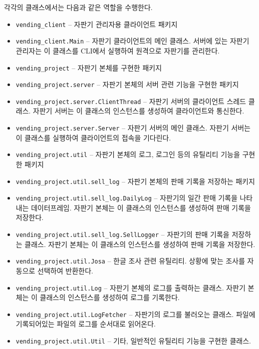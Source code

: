\documentclass{oblivoir}
\begin{document}
    각각의 클래스에서는 다음과 같은 역할을 수행한다.

    \begin{itemize}
        \item \texttt{vending\_client} -- 자판기 관리자용 클라이언트 패키지
        \item \texttt{vending\_client.Main} --
        자판기 클라이언트의 메인 클래스. 서버에 있는 자판기 관리자는 이 클래스를 CLI에서 실행하여 원격으로 자판기를 관리한다.
        \item \texttt{vending\_project} -- 자판기 본체를 구현한 패키지
        \item \texttt{vending\_project.server} -- 자판기 본체의 서버 관련 기능을 구현한 패키지
        \item \texttt{vending\_project.server.ClientThread} --
        자판기 서버의 클라이언트 스레드 클래스. 자판기 서버는 이 클래스의 인스턴스를 생성하여 클라이언트와 통신한다.
        \item \texttt{vending\_project.server.Server} --
        자판기 서버의 메인 클래스. 자판기 서버는 이 클래스를 실행하여 클라이언트의 접속을 기다린다.
        \item \texttt{vending\_project.util} -- 자판기 본체의 로그, 로그인 등의 유틸리티 기능을 구현한 패키지
        \item \texttt{vending\_project.util.sell\_log} -- 자판기 본체의 판매 기록을 저장하는 패키지
        \item \texttt{vending\_project.util.sell\_log.DailyLog} --
        자판기의 일간 판매 기록을 나타내는 데이터프레임. 자판기 본체는 이 클래스의 인스턴스를 생성하여 판매 기록을 저장한다.
        \item \texttt{vending\_project.util.sell\_log.SellLogger} --
        자판기의 판매 기록을 저장하는 클래스. 자판기 본체는 이 클래스의 인스턴스를 생성하여 판매 기록을 저장한다.
        \item \texttt{vending\_project.util.Josa} --
        한글 조사 관련 유틸리티. 상황에 맞는 조사를 자동으로 선택하여 반환한다.
        \item \texttt{vending\_project.util.Log} --
        자판기 본체의 로그를 출력하는 클래스. 자판기 본체는 이 클래스의 인스턴스를 생성하여 로그를 기록한다.
        \item \texttt{vending\_project.util.LogFetcher} --
        자판기의 로그를 불러오는 클래스. 파일에 기록되어있는 파일의 로그를 순서대로 읽어온다.
        \item \texttt{vending\_project.util.Util} --
        기타, 일반적인 유틸리티 기능을 구현한 클래스.

\end{itemize}
\end{document}
